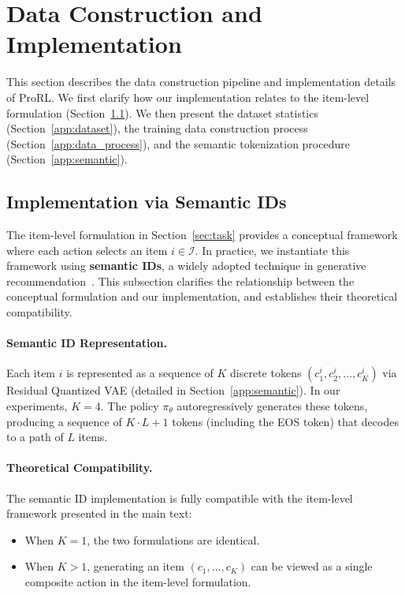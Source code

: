 \documentclass{llmxive}
\begin{document}
\section{Data Construction and Implementation}
\label{app:data}

This section describes the data construction pipeline and implementation details of ProRL. We first clarify how our implementation relates to the item-level formulation (Section~\ref{app:semantic_id}). We then present the dataset statistics (Section~\ref{app:dataset}), the training data construction process (Section~\ref{app:data_process}), and the semantic tokenization procedure (Section~\ref{app:semantic}).

\subsection{Implementation via Semantic IDs}
\label{app:semantic_id}

The item-level formulation in Section~\ref{sec:task} provides a conceptual framework where each action selects an item $i \in \mathcal{I}$. In practice, we instantiate this framework using \textbf{semantic IDs}, a widely adopted technique in generative recommendation~\cite{zhai2024actions,hou2025surveygenerativerecommendationdata}. This subsection clarifies the relationship between the conceptual formulation and our implementation, and establishes their theoretical compatibility.

\paragraph{Semantic ID Representation.} Each item $i$ is represented as a sequence of $K$ discrete tokens $(c_1^i, c_2^i, \ldots, c_K^i)$ via Residual Quantized VAE (detailed in Section~\ref{app:semantic}). In our experiments, $K=4$. The policy $\pi_\theta$ autoregressively generates these tokens, producing a sequence of $K \cdot L + 1$ tokens (including the EOS token) that decodes to a path of $L$ items.

\paragraph{Theoretical Compatibility.} The semantic ID implementation is fully compatible with the item-level framework presented in the main text:
\begin{itemize}
    \item When $K=1$, the two formulations are identical.
    \item When $K>1$, generating an item $(c_1, \ldots, c_K)$ can be viewed as a single composite action in the item-level formulation.
\end{itemize}
\end{document}
